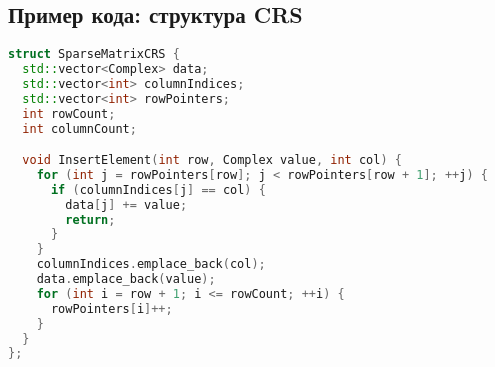 \documentclass[12pt]{article}
\begin{document}
\subsection*{Пример кода: структура CRS}
\begin{lstlisting}[language=C++]
struct SparseMatrixCRS {
  std::vector<Complex> data;
  std::vector<int> columnIndices;
  std::vector<int> rowPointers;
  int rowCount;
  int columnCount;

  void InsertElement(int row, Complex value, int col) {
    for (int j = rowPointers[row]; j < rowPointers[row + 1]; ++j) {
      if (columnIndices[j] == col) {
        data[j] += value;
        return;
      }
    }
    columnIndices.emplace_back(col);
    data.emplace_back(value);
    for (int i = row + 1; i <= rowCount; ++i) {
      rowPointers[i]++;
    }
  }
};
\end{lstlisting}
\end{document}
